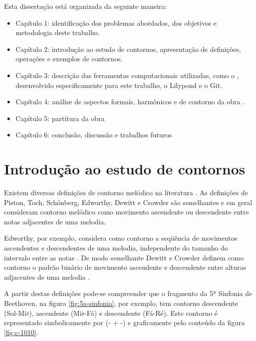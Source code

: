 Esta dissertação está organizada da seguinte maneira:

\begin{itemize}
\item Capítulo 1: identificação dos problemas abordados, dos objetivos
  e metodologia deste trabalho.
\item Capítulo 2: introdução ao estudo de contornos, apresentação de
  definições, operações e exemplos de contornos.
\item Capítulo 3: descrição das ferramentas computacionais utilizadas,
  como o \goiaba{}, desenvolvido especificamente para este trabalho, o
  Lilypond e o Git.
\item Capítulo 4: análise de aspectos formais, harmônicos e de
  contorno da obra \obra{}.
\item Capítulo 5: partitura da obra \obra{}
\item Capítulo 6: conclusão, discussão e trabalhos futuros
\end{itemize}

\chapter{Introdução ao estudo de contornos}
\label{cha:introducao-estudo-contornos}

Existem diversas definições de contorno melódico na literatura
\cite{piston59:harmony,toch77:shaping,schonberg:fundamentals,adams76:melodic,edworthy85:musical,dewitt.ea86:recognition,marvin.ea87:relating,morris87:composition,clifford95:contour,beard03:contour}.
As definições de Piston, Toch, Schönberg, Edworthy, Dewitt e Crowder
são semelhantes e em geral consideram contorno melódico como movimento
ascendente ou descendente entre notas adjacentes de uma melodia.

Edworthy, por exemplo, considera como contorno a seqüência de
movimentos ascendentes e descendentes de uma melodia, independente do
tamanho do intervalo entre as notas \cite{edworthy85:musical}. De modo
semelhante Dewitt e Crowder definem como contorno o padrão binário de
movimento ascendente e descendente entre alturas adjacentes de uma
melodia \cite{dewitt.ea86:recognition}.

A partir destas definições pode-se compreender que o fragmento da 5ª
Sinfonia de Beethoven, na figura \ref{fig:5a-sinfonia}, por exemplo,
tem contorno descendente (Sol-Mi$\flat$), ascendente (Mi$\flat$-Fá) e
descendente (Fá-Ré). Este contorno é representado simbolicamente por
(- + -) e graficamente pelo conteúdo da figura \ref{fig:c-1010}.

